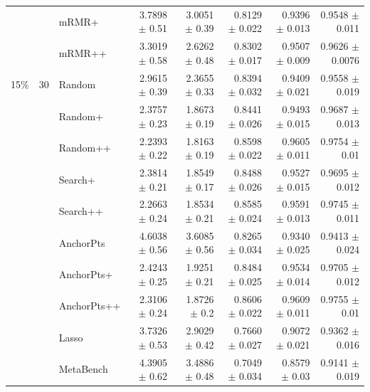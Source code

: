 \begin{longtable}{llp{}rrrrr}
 &  & mRMR+ & 3.7898 {\scriptsize $\pm$ 0.51} & 3.0051 {\scriptsize $\pm$ 0.39} & 0.8129 {\scriptsize $\pm$ 0.022} & 0.9396 {\scriptsize $\pm$ 0.013} & 0.9548 {\scriptsize $\pm$ 0.011} \\
 &  & mRMR++ & 3.3019 {\scriptsize $\pm$ 0.58} & 2.6262 {\scriptsize $\pm$ 0.48} & 0.8302 {\scriptsize $\pm$ 0.017} & 0.9507 {\scriptsize $\pm$ 0.009} & 0.9626 {\scriptsize $\pm$ 0.0076} \\
\midrule
15\% & 30 & Random & 2.9615 {\scriptsize $\pm$ 0.39} & 2.3655 {\scriptsize $\pm$ 0.33} & 0.8394 {\scriptsize $\pm$ 0.032} & 0.9409 {\scriptsize $\pm$ 0.021} & 0.9558 {\scriptsize $\pm$ 0.019} \\
 &  & Random+ & 2.3757 {\scriptsize $\pm$ 0.23} & 1.8673 {\scriptsize $\pm$ 0.19} & 0.8441 {\scriptsize $\pm$ 0.026} & 0.9493 {\scriptsize $\pm$ 0.015} & 0.9687 {\scriptsize $\pm$ 0.013} \\
 &  & Random++ & 2.2393 {\scriptsize $\pm$ 0.22} & 1.8163 {\scriptsize $\pm$ 0.19} & 0.8598 {\scriptsize $\pm$ 0.022} & 0.9605 {\scriptsize $\pm$ 0.011} & 0.9754 {\scriptsize $\pm$ 0.01} \\
 &  & Search+ & 2.3814 {\scriptsize $\pm$ 0.21} & 1.8549 {\scriptsize $\pm$ 0.17} & 0.8488 {\scriptsize $\pm$ 0.026} & 0.9527 {\scriptsize $\pm$ 0.015} & 0.9695 {\scriptsize $\pm$ 0.012} \\
 &  & Search++ & 2.2663 {\scriptsize $\pm$ 0.24} & 1.8534 {\scriptsize $\pm$ 0.21} & 0.8585 {\scriptsize $\pm$ 0.024} & 0.9591 {\scriptsize $\pm$ 0.013} & 0.9745 {\scriptsize $\pm$ 0.011} \\
 &  & AnchorPts & 4.6038 {\scriptsize $\pm$ 0.56} & 3.6085 {\scriptsize $\pm$ 0.56} & 0.8265 {\scriptsize $\pm$ 0.034} & 0.9340 {\scriptsize $\pm$ 0.025} & 0.9413 {\scriptsize $\pm$ 0.024} \\
 &  & AnchorPts+ & 2.4243 {\scriptsize $\pm$ 0.25} & 1.9251 {\scriptsize $\pm$ 0.21} & 0.8484 {\scriptsize $\pm$ 0.025} & 0.9534 {\scriptsize $\pm$ 0.014} & 0.9705 {\scriptsize $\pm$ 0.012} \\
 &  & AnchorPts++ & 2.3106 {\scriptsize $\pm$ 0.24} & 1.8726 {\scriptsize $\pm$ 0.2} & 0.8606 {\scriptsize $\pm$ 0.022} & 0.9609 {\scriptsize $\pm$ 0.011} & 0.9755 {\scriptsize $\pm$ 0.01} \\
 &  & Lasso & 3.7326 {\scriptsize $\pm$ 0.53} & 2.9029 {\scriptsize $\pm$ 0.42} & 0.7660 {\scriptsize $\pm$ 0.027} & 0.9072 {\scriptsize $\pm$ 0.021} & 0.9362 {\scriptsize $\pm$ 0.016} \\
 &  & MetaBench & 4.3905 {\scriptsize $\pm$ 0.62} & 3.4886 {\scriptsize $\pm$ 0.48} & 0.7049 {\scriptsize $\pm$ 0.034} & 0.8579 {\scriptsize $\pm$ 0.03} & 0.9141 {\scriptsize $\pm$ 0.019} \\

\end{longtable}
